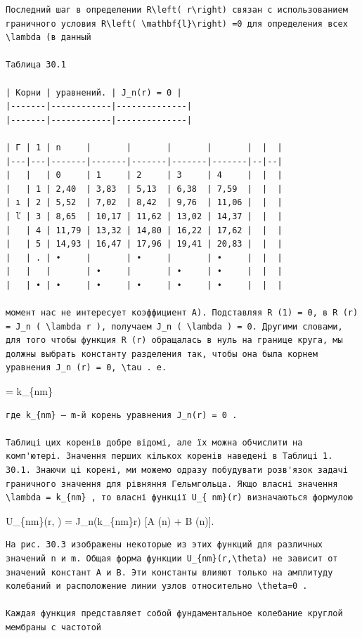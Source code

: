 \documentclass[
  ukrainian,
]{article}
\begin{document}
\begin{verbatim}
Последний шаг в определении R\left( r\right) связан с использованием граничного условия R\left( \mathbf{l}\right) =0 для определения всех \lambda (в данный

Таблица 30.1

| Корни | уравнений. | J_n(r) = 0 |
|-------|------------|--------------|
|-------|------------|--------------|

| Γ | 1 | n     |       |       |       |       |  |  |
|---|---|-------|-------|-------|-------|-------|--|--|
|   |   | 0     | 1     | 2     | 3     | 4     |  |  |
|   | 1 | 2,40  | 3,83  | 5,13  | 6,38  | 7,59  |  |  |
| ı | 2 | 5,52  | 7,02  | 8,42  | 9,76  | 11,06 |  |  |
| ľ | 3 | 8,65  | 10,17 | 11,62 | 13,02 | 14,37 |  |  |
|   | 4 | 11,79 | 13,32 | 14,80 | 16,22 | 17,62 |  |  |
|   | 5 | 14,93 | 16,47 | 17,96 | 19,41 | 20,83 |  |  |
|   | . | •     |       | •     |       | •     |  |  |
|   |   |       | •     |       | •     | •     |  |  |
|   | • | •     | •     | •     | •     | •     |  |  |

момент нас не интересует коэффициент A). Подставляя R (1) = 0, в R (r) = J_n ( \lambda r ), получаем J_n ( \lambda ) = 0. Другими словами, для того чтобы функция R (r) обращалась в нуль на границе круга, мы должны выбрать константу разделения так, чтобы она была корнем уравнения J_n (r) = 0, \tau . e.
\end{verbatim}

\lambda = k\_\{nm\}

\begin{verbatim}
где k_{nm} — m-й корень уравнения J_n(r) = 0 .

Таблиці цих коренів добре відомі, але їх можна обчислити на комп'ютері. Значення перших кількох коренів наведені в Таблиці 1. 30.1. Знаючи ці корені, ми можемо одразу побудувати розв'язок задачі граничного значення для рівняння Гельмгольца. Якщо власні значення \lambda = k_{nm} , то власні функції U_{ nm}(r) визначаються формулою
\end{verbatim}

U\_\{nm\}(r, \theta) = J\_n(k\_\{nm\}r) {[}A \sin(n\theta) + B
\cos(n\theta){]}.

\begin{verbatim}
На рис. 30.3 изображены некоторые из этих функций для различных значений n и m. Общая форма функции U_{nm}(r,\theta) не зависит от значений констант A и B. Эти константы влияют только на амплитуду колебаний и расположение линии узлов относительно \theta=0 .

Каждая функция представляет собой фундаментальное колебание круглой мембраны с частотой
\end{verbatim}
\end{document}
